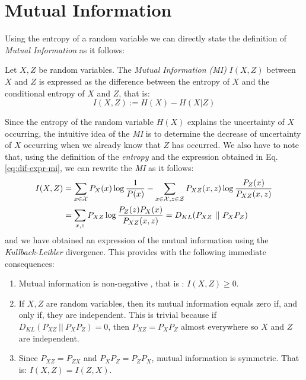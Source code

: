 \section{Mutual Information}

Using the entropy of a random variable we can directly state the definition of \emph{Mutual Information} as it follows:

\begin{ndef}
Let $X,Z$ be random variables. The \emph{Mutual Information (MI)} $I(X,Z)$ between $X$ and $Z$ is expressed as the difference between the entropy of $X$ and the conditional entropy of $X$ and $Z$, that is:
$$
I(X,Z) := H(X) - H(X|Z)
$$
\end{ndef}

Since the entropy of the random variable $H(X)$ explains the uncertainty of $X$ occurring, the intuitive idea of the \emph{MI} is to determine the decrease of uncertainty of $X$ occurring when we already
know that $Z$ has occurred. We also have to note that, using the definition of the \emph{entropy} and the expression obtained in Eq. \ref{eq:dif-expr-mi}, we can rewrite the \emph{MI} as it follows:
\begin{align*}
I(X,Z) & = \sum_{x \in \mathcal{X}}P_X(x) \log \frac{1}{P(x)} - \sum_{x \in \mathcal{X}, z \in \mathcal Z} P_{XZ}(x,z) \log \frac{P_Z(x)}{P_{XZ}(x,z)} \\  & = \sum_{x,z}P_{XZ}\log \frac{P_Z(z)P_X(x)}{P_{XZ}(x,z)} = D_{KL}(P_{XZ} \ || \ P_X P_Z)
\end{align*}
and we have obtained an expression of the mutual information using the \emph{Kullback-Leibler} divergence. This provides with the following immediate consequences:
\begin{enumerate}[label=$(\roman*)$]
\item Mutual information is non-negative , that is : $I(X,Z) \geq 0$.
\item If $X,Z$ are random variables, then its mutual information equals zero if, and only if, they are independent. This is trivial because if $D_{KL}(P_{XZ} \ || \ P_X P_Z) = 0$, then $P_{XZ} = P_X P_Z$ almost everywhere so $X$ and $Z$ are independent.
\item Since $P_{XZ} = P_{ZX}$ and $P_X P_Z = P_Z P_X$, mutual information is symmetric. That is: $I(X,Z) = I(Z,X)$.
\end{enumerate}